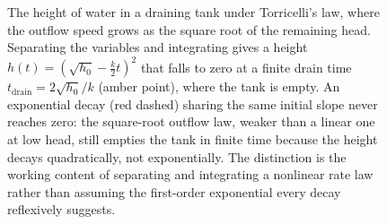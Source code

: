 \begin{figure}[htbp]
\centering
{}
\caption[Draining-tank height under Torricelli's law]{The height of water
in a draining tank under Torricelli's law, where the outflow speed grows
as the square root of the remaining head. Separating the variables and
integrating gives a height $h(t) = (\sqrt{h_0} - \tfrac{k}{2}t)^2$ that
falls to zero at a finite drain time $t_{\mathrm{drain}} =
2\sqrt{h_0}/k$ (amber point), where the tank is empty. An exponential
decay (red dashed) sharing the same initial slope never reaches zero: the
square-root outflow law, weaker than a linear one at low head, still
empties the tank in finite time because the height decays quadratically,
not exponentially. The distinction is the working content of separating
and integrating a nonlinear rate law rather than assuming the
first-order exponential every decay reflexively suggests.}
\label{fig:vol02ch06:tank-drainage}
\end{figure}
